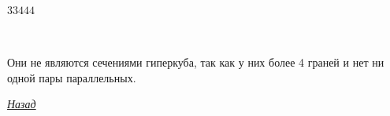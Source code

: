 \documentclass[10pt,pdf,hyperref={unicode}]{beamer}
\begin{document}
\begin{frame}
\begin{columns}
		\begin{block}{}
			{\large $33444$}
		\end{block}
	\end{columns}
	\\
\hfill \break
	Они не являются сечениями гиперкуба, так как у них более 4 граней и нет ни одной пары параллельных.

	{\raggedleft\vfill\itshape\Longstack[l]
		\hyperlink{theorem2_back}{Назад} \\
	}\par
\end{frame}
\end{document}

